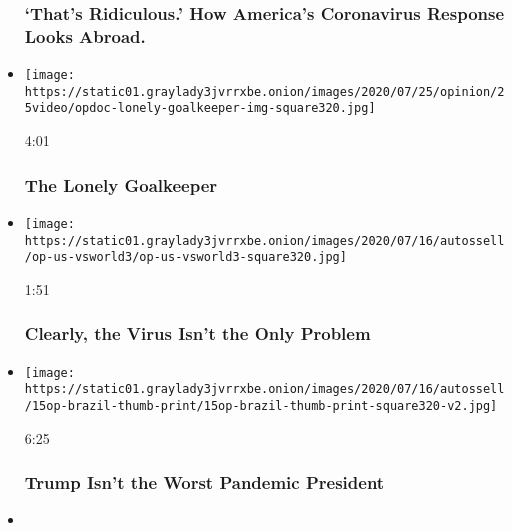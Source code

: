 \begin{itemize}
{  \subsubsection{`That's Ridiculous.' How America's Coronavirus Response
  Looks
  Abroad.}\label{thats-ridiculous-how-americas-coronavirus-response-looks-abroad}}
\item
  \href{https://www.nytimes3xbfgragh.onion/video/opinion/100000007229285/the-lonely-goalkeeper.html?action=click\&module=video-series-bar\&region=header\&pgtype=Article\&playlistId=video/opinion}{}

  \texttt{[image: https://static01.graylady3jvrrxbe.onion/images/2020/07/25/opinion/25video/opdoc-lonely-goalkeeper-img-square320.jpg]}

  4:01

  \hypertarget{the-lonely-goalkeeper}{%
  \subsubsection{The Lonely Goalkeeper}\label{the-lonely-goalkeeper}}
\item
  \href{https://www.nytimes3xbfgragh.onion/video/opinion/100000007242791/coronavirus-response-america.html?action=click\&module=video-series-bar\&region=header\&pgtype=Article\&playlistId=video/opinion}{}

  \texttt{[image: https://static01.graylady3jvrrxbe.onion/images/2020/07/16/autossell/op-us-vsworld3/op-us-vsworld3-square320.jpg]}

  1:51

  \hypertarget{clearly-the-virus-isnt-the-only-problem}{%
  \subsubsection{Clearly, the Virus Isn't the Only
  Problem}\label{clearly-the-virus-isnt-the-only-problem}}
\item
  \href{https://www.nytimes3xbfgragh.onion/video/opinion/100000007227771/coronavirus-covid-brazil-bolsonaro.html?action=click\&module=video-series-bar\&region=header\&pgtype=Article\&playlistId=video/opinion}{}

  \texttt{[image: https://static01.graylady3jvrrxbe.onion/images/2020/07/16/autossell/15op-brazil-thumb-print/15op-brazil-thumb-print-square320-v2.jpg]}

  6:25

  \hypertarget{trump-isnt-the-worst-pandemic-president}{%
  \subsubsection{Trump Isn't the Worst Pandemic
  President}\label{trump-isnt-the-worst-pandemic-president}}
\item
  \href{https://www.nytimes3xbfgragh.onion/video/opinion/100000007227752/hollywood-latinos-diversity.html?action=click\&module=video-series-bar\&region=header\&pgtype=Article\&playlistId=video/opinion}{}


\end{itemize}
